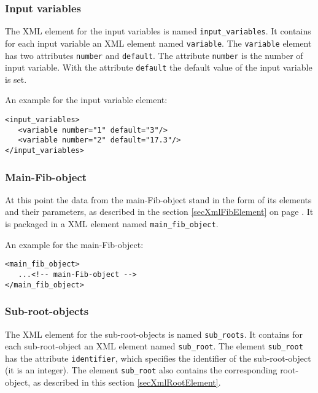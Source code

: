 

\subsubsection{Input variables}
\label{secXmlRootInputVar}

The XML element for the input variables is named \verb|input_variables|. It contains for each input variable an XML element named \verb|variable|. The \verb|variable| element has two attributes \verb|number| and \verb|default|. The attribute \verb|number| is the number of input variable. With the attribute \verb|default| the default value of the input variable is set.

\bigskip\noindent
An example for the input variable element:
\begin{verbatim}
<input_variables>
   <variable number="1" default="3"/>
   <variable number="2" default="17.3"/>
</input_variables>
\end{verbatim}


\subsubsection{Main-Fib-object}
\label{secXmlRootMainObject}

At this point the data from the main-Fib-object stand in the form of its elements and their parameters, as described in the section \ref{secXmlFibElement} on page \pageref{secXmlFibElement}. It is packaged in a XML element named \verb|main_fib_object|.

\bigskip\noindent
An example for the main-Fib-object:
\begin{verbatim}
<main_fib_object>
   ...<!-- main-Fib-object -->
</main_fib_object>
\end{verbatim}


\subsubsection{Sub-root-objects}
\label{secXmlRootSubRoot}

The XML element for the sub-root-objects is named \verb|sub_roots|. It contains for each sub-root-object an XML element named \verb|sub_root|. The element \verb|sub_root| has the attribute \verb|identifier|, which specifies the identifier of the sub-root-object (it is an integer). The element \verb|sub_root| also contains the corresponding root-object, as described in this section \ref{secXmlRootElement}.

